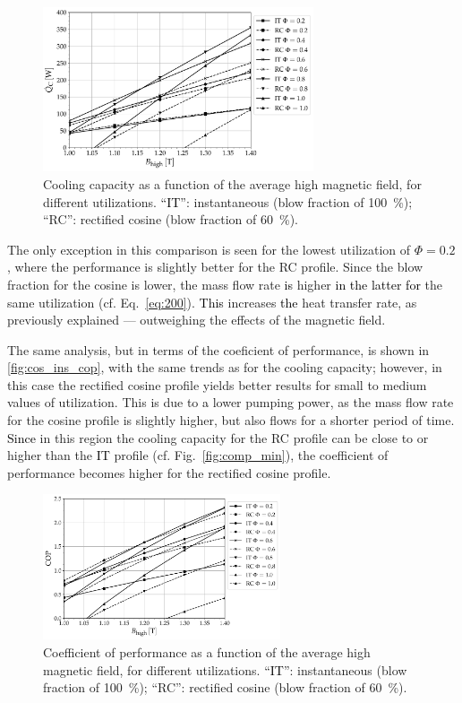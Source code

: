 \documentclass[referee]{svjour3}
\begin{document}
\begin{figure}[!ht]
  \centering
\includegraphics[width=8cm]{Qc_B_comp_f_1_same_minimum}
  \caption{Cooling capacity as a function of the  average high magnetic field, for different utilizations. \textcolor{black}{``IT''}: instantaneous (blow fraction of \SI{100}{\percent}); ``RC'': rectified cosine  (blow fraction of \SI{60}{\percent}).}
 \label{fig:cos_ins}
\end{figure}

The only exception in this comparison  is seen for the lowest utilization of $\Phi = 0.2$, where the performance is slightly better for the RC profile. Since the blow fraction for the cosine is lower, the mass flow rate \textcolor{black}{is} higher \textcolor{black}{in the latter for} the same utilization (cf. Eq.~\eqref{eq:200}). \textcolor{black}{This} increases \textcolor{black}{the} heat transfer rate, as previously explained ---  outweighing the effects of the magnetic field.


The same analysis, but in terms of the coeficient of performance, is shown in \autoref{fig:cos_ins_cop}, with the same trends as for the cooling capacity; however, in this case  the rectified cosine profile yields better results for small to medium values of utilization. This is due to \textcolor{black}{a} lower pumping power, as the mass flow rate for the cosine profile is slightly higher, but also flows for a shorter period of time. \textcolor{black}{Since} in this region the cooling capacity for the RC profile can be close to or higher than the \textcolor{black}{IT} profile (cf. Fig.~\autoref{fig:comp_min}), the coefficient of performance becomes higher for the rectified cosine profile.

\begin{figure}[!ht]
  \centering
\includegraphics[width=7cm]{COP_B_comp_f_1_same_minimum}
  \caption{Coefficient of performance as a function of the  average high magnetic field, for different utilizations. \textcolor{black}{``IT''}: instantaneous (blow fraction of \SI{100}{\percent}); ``RC'': rectified cosine  (blow fraction of \SI{60}{\percent}).}
 \label{fig:cos_ins_cop}
\end{figure}
\end{document}
